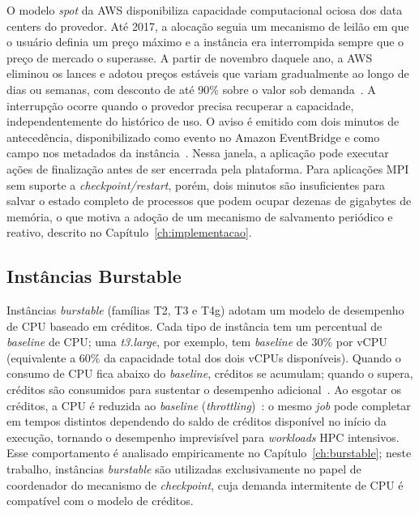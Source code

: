O modelo \textit{spot} da AWS disponibiliza capacidade computacional ociosa dos
data centers do provedor. Até 2017, a alocação seguia um mecanismo de leilão em que o
usuário definia um preço máximo e a instância era interrompida sempre que o preço
de mercado o superasse. A partir de novembro daquele ano, a AWS eliminou os lances
e adotou preços estáveis que variam gradualmente ao longo de dias ou semanas, com
desconto de até 90\% sobre o valor sob demanda~\cite{aws2018spot}. A
interrupção ocorre quando o provedor precisa recuperar a capacidade, independentemente
do histórico de uso. O aviso é emitido com dois minutos de antecedência,
disponibilizado como evento no Amazon EventBridge e como campo nos metadados da
instância~\cite{aws2026spot_termination}. Nessa janela, a aplicação pode executar
ações de finalização antes de ser encerrada pela plataforma. Para aplicações MPI sem
suporte a \textit{checkpoint/restart}, porém, dois minutos são insuficientes para
salvar o estado completo de processos que podem ocupar dezenas de gigabytes de
memória, o que motiva a adoção de um mecanismo de salvamento periódico e reativo,
descrito no Capítulo~\ref{ch:implementacao}.

\subsection{Instâncias Burstable}
\label{sec:burstable}

Instâncias \textit{burstable} (famílias T2, T3 e T4g) adotam um modelo de
desempenho de CPU baseado em créditos. Cada tipo de instância tem um percentual de
\textit{baseline} de CPU; uma \textit{t3.large},
por exemplo, tem \textit{baseline} de 30\% por vCPU (equivalente a 60\% da capacidade
total dos dois vCPUs disponíveis). Quando o
consumo de CPU fica abaixo do \textit{baseline}, créditos se acumulam;
quando o supera, créditos são consumidos para sustentar o desempenho
adicional~\cite{aws2026burstable}. Ao esgotar os créditos, a CPU é reduzida ao \textit{baseline}
(\textit{throttling})~\cite{wang2017burstable}: o mesmo \textit{job} pode completar
em tempos distintos dependendo do saldo de créditos disponível no início da execução,
tornando o desempenho imprevisível para \textit{workloads} HPC intensivos. Esse comportamento é analisado
empiricamente no Capítulo~\ref{ch:burstable}; neste trabalho, instâncias
\textit{burstable} são utilizadas exclusivamente no papel de coordenador do mecanismo
de \textit{checkpoint}, cuja demanda intermitente de CPU é compatível com o modelo
de créditos.


